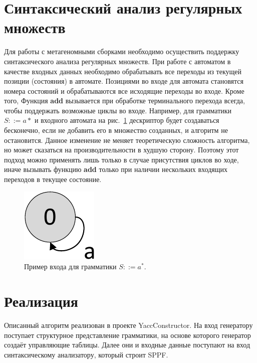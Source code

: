 \documentclass[12pt]{matmex-diploma-custom}
\begin{document}
    \section{Синтаксический анализ регулярных множеств}
    Для работы с метагеномными сборками необходимо осуществить поддержку синтаксического анализа регулярных множеств.
    При работе с автоматом в качестве входных данных необходимо обрабатывать все переходы из текущей позиции (состояния) в автомате.
    Позициями во входе для автомата становятся номера состояний и обрабатываются все исходящие переходы во входе. Кроме того,    
    Функция \textbf{add} вызывается при обработке терминального перехода всегда, чтобы поддержать возможные циклы во входе.
    Например, для грамматики $S ::= a*$ и входного автомата на рис.~\ref{graphEx}
    дескриптор будет создаваться бесконечно, если не добавить его в множество созданных, и алгоритм не остановится.
    Данное изменение не меняет теоретическую сложность алгоритма, но может сказаться на производительности в худшую сторону.
    Поэтому этот подход можно применять лишь только в случае присутствия циклов во ходе, иначе вызывать функцию \textbf{add}
    только при наличии нескольких входящих переходов в текущее состояние.
    
    \begin{figure}[ht]   
        \centering
        \includegraphics[scale=.5]{../text/pictures/graphEx.pdf}
        \caption{Пример входа для грамматики $S ::= a^*$.}
        \label{graphEx}
    \end{figure}

    \section{Реализация}
    
    Описанный алгоритм реализован в проекте YaccConstructor. 
    На вход генератору поступает структурное представление грамматики, на основе которого 
    генератор создаёт управляющие таблицы. Далее они и входные данные поступают на вход
    синтаксическому анализатору, который строит SPPF. 
    
\end{document}
